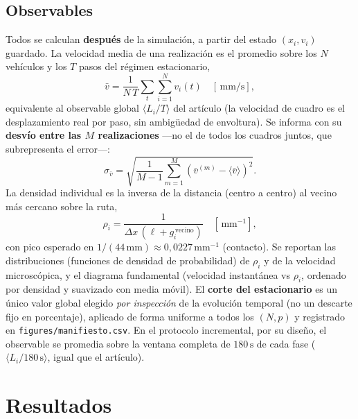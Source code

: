 \documentclass[11pt,a4paper]{article}
\newcommand{\unit}[1]{\,\mathrm{#1}}
\begin{document}
\subsection{Observables}

Todos se calculan \textbf{después} de la simulación, a partir del estado
$(x_i,v_i)$ guardado. La velocidad media de una realización es el promedio sobre los
$N$ vehículos y los $T$ pasos del régimen estacionario,
\begin{equation}
\bar{v} = \frac{1}{N\,T}\sum_{t}\sum_{i=1}^{N} v_i(t) \quad [\unit{mm/s}],
\label{eq:vmedia}
\end{equation}
equivalente al observable global $\langle L_i/T\rangle$ del artículo (la velocidad de
cuadro es el desplazamiento real por paso, sin ambigüedad de envoltura). Se informa con
su \textbf{desvío entre las $M$ realizaciones} —no el de todos los cuadros juntos, que
subrepresenta el error—:
\begin{equation}
\sigma_{\bar v} = \sqrt{\frac{1}{M-1}\sum_{m=1}^{M}\left(\bar v^{(m)} - \langle \bar v\rangle\right)^2}.
\label{eq:error}
\end{equation}
La densidad individual es la inversa de la distancia (centro a centro) al vecino más
cercano sobre la ruta,
\begin{equation}
\rho_i = \frac{1}{\Delta x\,(\ell + g_i^{\,\mathrm{vecino}})} \quad [\unit{mm^{-1}}],
\label{eq:densidad}
\end{equation}
con pico esperado en $1/(44\unit{mm})\approx0{,}0227\unit{mm^{-1}}$ (contacto). Se reportan
las distribuciones (funciones de densidad de probabilidad) de $\rho_i$ y de la velocidad microscópica, y el diagrama
fundamental (velocidad instantánea vs $\rho_i$, ordenado por densidad y suavizado con
media móvil). El \textbf{corte del estacionario} es un único valor global elegido
\emph{por inspección} de la evolución temporal (no un descarte fijo en porcentaje),
aplicado de forma uniforme a todos los $(N,p)$ y registrado en
\texttt{figures/manifiesto.csv}. En el protocolo incremental, por su diseño, el
observable se promedia sobre la ventana completa de $180\unit{s}$ de cada fase
($\langle L_i/180\unit{s}\rangle$, igual que el artículo).

\section{Resultados}
\end{document}
